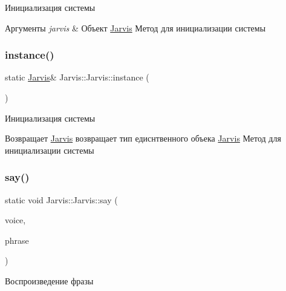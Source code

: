 Инициализация системы 


\begin{DoxyParams}{Аргументы}
{\em jarvis} & Объект \hyperlink{classJarvis_1_1Jarvis}{Jarvis} Метод для инициализации системы \\
\hline
\end{DoxyParams}
\mbox{\label{classJarvis_1_1Jarvis_a6f50fbb249174da350352dc3429459b7}} 
\subsubsection{\texorpdfstring{instance()}{instance()}}
{\footnotesize\ttfamily static \hyperlink{classJarvis_1_1Jarvis}{Jarvis}\& Jarvis\+::\+Jarvis\+::instance (\begin{DoxyParamCaption}{ }\end{DoxyParamCaption})\hspace{0.3cm}{\ttfamily [static]}}



Инициализация системы 

\begin{DoxyReturn}{Возвращает}
\hyperlink{classJarvis_1_1Jarvis}{Jarvis} возвращает тип едиснтвенного объека \hyperlink{classJarvis_1_1Jarvis}{Jarvis} Метод для инициализации системы 
\end{DoxyReturn}
\mbox{\label{classJarvis_1_1Jarvis_a80c00115e07bf149673b3cf652751386}} 
\subsubsection{\texorpdfstring{say()}{say()}}
{\footnotesize\ttfamily static void Jarvis\+::\+Jarvis\+::say (\begin{DoxyParamCaption}\item[{\hyperlink{classJarvis_1_1Voice}{Voice} \&}]{voice,  }\item[{const say\+Phrase \&}]{phrase }\end{DoxyParamCaption})\hspace{0.3cm}{\ttfamily [static]}}



Воспроизведение фразы 


